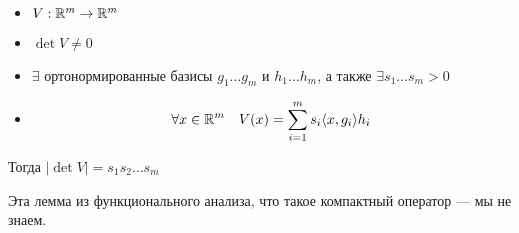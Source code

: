

\cfoot{}



\begin{lemma}\itemfix
    \begin{itemize}
        \item \(V : \mathbb{R}^m \to \mathbb{R}^m\)
        \item \(\det V \neq 0\)
        \item \(\exists \) ортонормированные базисы \(g_1 \dots g_m\) и \(h_1 \dots h_m\), а также \(\exists s_1 \dots s_m > 0\)
        \item \[\forall x\in\mathbb{R}^m \quad V(x) = \sum_{i = 1}^m s_i\langle x, g_i\rangle h_i\]
    \end{itemize}

    Тогда \(|\det V| = s_1s_2 \dots s_m\)
\end{lemma}

\begin{remark}
    Эта лемма из функционального анализа, что такое компактный оператор --- мы не знаем.
\end{remark}

